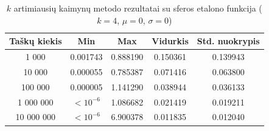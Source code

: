 \begin{table}[H]
    \centering
    \begin{tabular}{|c|c|c|c|c|}
        \hline
        \textbf{Taškų kiekis} & \textbf{Min} & \textbf{Max} & \textbf{Vidurkis} & \textbf{Std. nuokrypis} \\ \hline
        1 000        & 0.001743 & 0.888190 & 0.150361 & 0.139943 \\ \hline
        10 000       & 0.000055 & 0.785387 & 0.071416 & 0.063800 \\ \hline
        100 000      & 0.000005 & 1.141290 & 0.038944 & 0.036133 \\ \hline
        1 000 000    & $<10^{-6}$ & 1.086682 & 0.021419 & 0.019211 \\ \hline
        10 000 000   & $<10^{-6}$ & 6.900378 & 0.011835 & 0.012040 \\ \hline
    \end{tabular}
    \caption{$k$ artimiausių kaimynų metodo rezultatai su sferos etalono funkcija ($k = 4$, $\mu = 0$, $\sigma = 0$)}
\end{table}